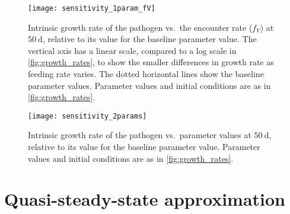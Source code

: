 \documentclass{article}
\begin{document}
\begin{figure}
  \centering
  \texttt{[image: sensitivity\_1param\_fV]}
  \caption{Intrinsic growth rate of the pathogen vs.~the encounter
    rate ($f_V$) at $50~\text{d}$, relative to its value for the
    baseline parameter value.  The vertical axis has a linear scale,
    compared to a log scale in \autoref{fig:growth_rates}, to show the
    smaller differences in growth rate as feeding rate varies.  The
    dotted horizontal lines show the baseline parameter values.
    Parameter values and initial conditions are as in
    \autoref{fig:growth_rates}.}
  \label{fig:sensitivity_1param_fV}
\end{figure}

\begin{figure}
  \centering
  \texttt{[image: sensitivity\_2params]}
  \caption{Intrinsic growth rate of the pathogen vs.~parameter values
    at $50~\text{d}$, relative to its value for the baseline
    parameter value.  Parameter values and
    initial conditions are as in \autoref{fig:growth_rates}.}
  \label{fig:sensitivity_2params}
\end{figure}


\clearpage
\appendix
\section{Quasi-steady-state approximation}
\label{sec:QSSA}
\end{document}

